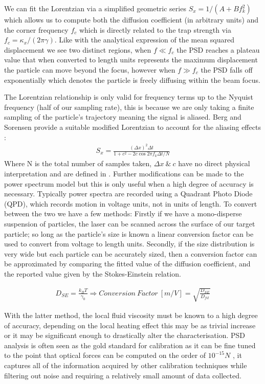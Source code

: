 \documentclass[a4paper,oneside,11pt]{book}
\begin{document}
We can fit the Lorentzian via a simplified geometric series $S_x = 1/(A+Bf_k^2)$ which allows us to compute both the diffusion coefficient (in arbitrary units) and the corner frequency $f_c$ which is directly related to the trap strength via $f_c = \kappa_x/(2\pi\gamma)$. Like with the analytical expression of the mean squared displacement we see two distinct regions, when $f\ll f_c$ the PSD reaches a plateau value that when converted to length units represents the maximum displacement the particle can move beyond the focus, however when $f\gg f_c$ the PSD falls off exponentially which denotes the particle is freely diffusing within the beam focus.
  
The Lorentzian relationship is only valid for frequency terms up to the Nyquist frequency (half of our sampling rate), this is because we are only taking a finite sampling of the particle's trajectory meaning the signal is aliased. Berg and Sorensen provide a suitable modified Lorentzian to account for the aliasing effects \cite{BergSoerensen2004}:
\begin{align}
	S_x = \frac{(\Delta x)^2\Delta t}{1+c^2-2c\cos{2\pi f_k\Delta t/N}}
\end{align}
Where N is the total number of samples taken, $\Delta x \ \& \ c$  have no direct physical interpretation and are defined in \cite{BergSoerensen2004}. Further modifications can be made to the power spectrum model but this is only useful when a high degree of accuracy is necessary. Typically power spectra are recorded using a Quadrant Photo Diode (QPD), which records motion in voltage units, not in units of length. To convert between the two we have a few methods: Firstly if we have a mono-disperse suspension of particles, the laser can be scanned across the surface of our target particle; so long as the particle's size is known a linear conversion factor can be used to convert from voltage to length units. Secondly, if the size distribution is very wide but each particle can be accurately sized, then a conversion factor can be approximated by comparing the fitted value of the diffusion coefficient, and the reported value given by the Stokes-Einstein relation.

\begin{align}
	D_{SE} = \frac{k_BT}{\gamma_0} \Rightarrow Conversion\ Factor \ [m/V]= \sqrt{\frac{D_{SE}}{D_{fit}}}
\end{align}

With the latter method, the local fluid viscosity must be known to a high degree of accuracy, depending on the local heating effect this may be as trivial increase or it may be significant enough to drastically alter the characterisation. PSD analysis is often seen as the gold standard for calibration as it can be fine tuned to the point that optical forces can be computed on the order of $10^{-15} N$ \cite{BergSoerensen2004}, it captures all of the information acquired by other calibration techniques while filtering out noise and requiring a relatively small amount of data collected. 
\end{document}
